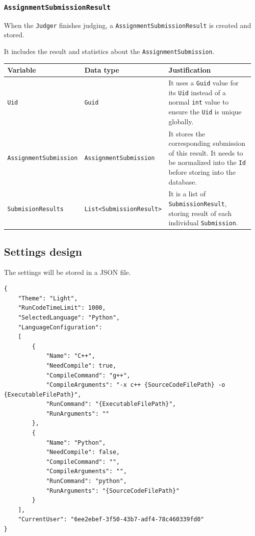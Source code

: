 \documentclass[a4paper]{report}
\begin{document}
\subsubsection{\texttt{AssignmentSubmissionResult}}

When the \texttt{Judger} finishes judging, a \texttt{AssignmentSubmissionResult} is created and stored.

It includes the result and statistics about the \texttt{AssignmentSubmission}.

\begin{tabulary}{\textwidth}{|l|l|L|}
    \hline
    Variable & Data type & Justification \\
    \hline
    \texttt{Uid} & \texttt{Guid} & It uses a \texttt{Guid} value for its \texttt{Uid} instead of a normal \texttt{int} value to ensure the \texttt{Uid} is unique globally. \\
    \hline
    \texttt{AssignmentSubmission} & \texttt{AssignmentSubmission} & It stores the corresponding submission of this result. It needs to be normalized into the \texttt{Id} before storing into the database. \\
    \hline
    \texttt{SubmisionResults} & \texttt{List<SubmissionResult>} & It is a list of \texttt{SubmissionResult}, storing result of each individual \texttt{Submission}. \\
    \hline
\end{tabulary}

\subsection{Settings design}

The settings will be stored in a JSON file.

\begin{verbatim}
{
    "Theme": "Light",
    "RunCodeTimeLimit": 1000,
    "SelectedLanguage": "Python",
    "LanguageConfiguration": 
    [
        {
            "Name": "C++",
            "NeedCompile": true,
            "CompileCommand": "g++",
            "CompileArguments": "-x c++ {SourceCodeFilePath} -o {ExecutableFilePath}",
            "RunCommand": "{ExecutableFilePath}",
            "RunArguments": ""
        },
        {
            "Name": "Python",
            "NeedCompile": false,
            "CompileCommand": "",
            "CompileArguments": "",
            "RunCommand": "python",
            "RunArguments": "{SourceCodeFilePath}"
        }
    ],
    "CurrentUser": "6ee2ebef-3f50-43b7-adf4-78c460339fd0"
}
\end{verbatim}
\end{document}

